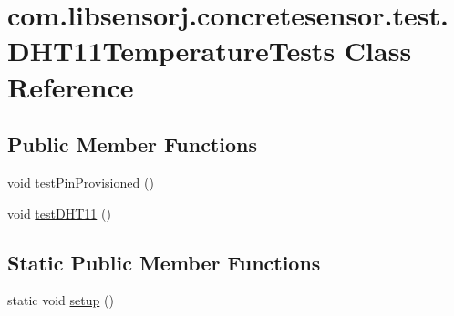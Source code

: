 \hypertarget{classcom_1_1libsensorj_1_1concretesensor_1_1test_1_1DHT11TemperatureTests}{}\section{com.\+libsensorj.\+concretesensor.\+test.\+D\+H\+T11\+Temperature\+Tests Class Reference}
\label{classcom_1_1libsensorj_1_1concretesensor_1_1test_1_1DHT11TemperatureTests}
\subsection*{Public Member Functions}
\begin{DoxyCompactItemize}
\item 
void \hyperlink{classcom_1_1libsensorj_1_1concretesensor_1_1test_1_1DHT11TemperatureTests_a45f30914d4e9956bd21d0e2b5f05554d}{test\+Pin\+Provisioned} ()
\item 
void \hyperlink{classcom_1_1libsensorj_1_1concretesensor_1_1test_1_1DHT11TemperatureTests_a21c7d408640f66dcc29b5ace6b129f7a}{test\+D\+H\+T11} ()
\end{DoxyCompactItemize}
\subsection*{Static Public Member Functions}
\begin{DoxyCompactItemize}
\item 
static void \hyperlink{classcom_1_1libsensorj_1_1concretesensor_1_1test_1_1DHT11TemperatureTests_a1bc150d93e863d5d10ec0a16ae44779b}{setup} ()
\end{DoxyCompactItemize}
